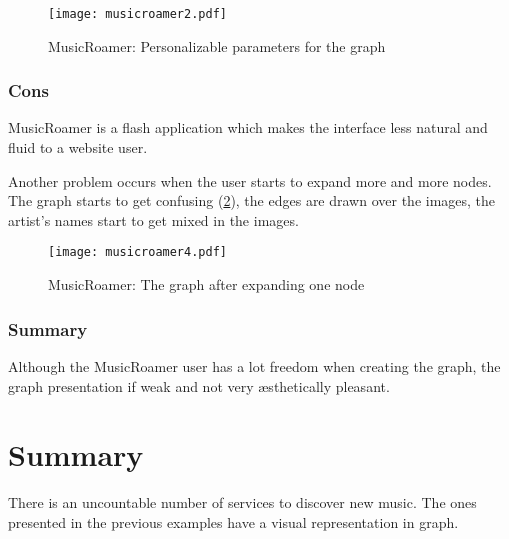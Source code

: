  \begin{figure}[tb]
    \begin{center}
      \texttt{[image: musicroamer2.pdf]}
    \end{center}
    \caption{MusicRoamer: Personalizable parameters for the graph }
    \label{fig:sota_musicroamer3}
  \end{figure}


  \subsubsection{Cons} %
  \label{ssub:cons}

  MusicRoamer is a flash application which makes the interface less natural and fluid to a website user.

  Another problem occurs when the user starts to expand more and more nodes.
  The graph starts to get confusing (\ref{fig:sota_musicroamer4}), the edges are drawn over the images, the artist's names start to get mixed in the images.

  \begin{figure}[tb]
    \begin{center}
      \texttt{[image: musicroamer4.pdf]}
    \end{center}
    \caption{MusicRoamer: The graph after expanding one node}
    \label{fig:sota_musicroamer4}
  \end{figure}


  \subsubsection{Summary} %
  \label{ssub:summary}

  Although the MusicRoamer user has a lot freedom when creating the graph, the graph presentation if weak and not very æsthetically pleasant.






\section{Summary}

There is an uncountable number of services to discover new music.
The ones presented in the previous examples have a visual representation in graph.

